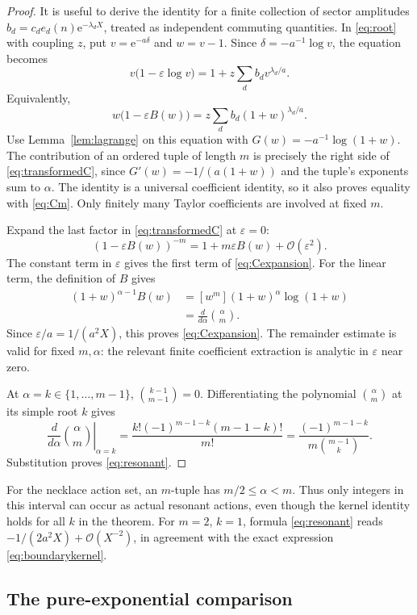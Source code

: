 \documentclass[11pt,a4paper]{article}
\numberwithin{equation}{section}
\theoremstyle{definition}
\theoremstyle{remark}
\newcommand{\ee}{\mathrm e}
\newcommand{\bigO}{\mathcal O}
\newcommand{\eps}{\varepsilon}
\begin{document}
\begin{proof}
It is useful to derive the identity for a finite collection of sector
amplitudes $b_d=c_de_d(n)\ee^{-\lambda_dX}$, treated as independent
commuting quantities. In \eqref{eq:root} with coupling $z$, put
$v=\ee^{-a\delta}$ and $w=v-1$. Since
$\delta=-a^{-1}\log v$, the equation becomes
\[
 v\bigl(1-\eps\log v\bigr)
 =1+z\sum_d b_d v^{\lambda_d/a}.
\]
Equivalently,
\begin{equation}
 w\bigl(1-\eps B(w)\bigr)
 =z\sum_d b_d(1+w)^{\lambda_d/a}.
 \label{eq:wequation}
\end{equation}
Use Lemma~\ref{lem:lagrange} on this equation with
$G(w)=-a^{-1}\log(1+w)$. The contribution of an ordered tuple of
length $m$ is precisely the right side of
\eqref{eq:transformedC}, since $G'(w)=-1/(a(1+w))$ and the tuple's
exponents sum to $\alpha$. The identity is a universal coefficient
identity, so it also proves equality with \eqref{eq:Cm}. Only finitely
many Taylor coefficients are involved at fixed $m$.

Expand the last factor in \eqref{eq:transformedC} at $\eps=0$:
\[
 (1-\eps B(w))^{-m}=1+m\eps B(w)+\bigO(\eps^2).
\]
The constant term in $\eps$ gives the first term of
\eqref{eq:Cexpansion}. For the linear term, the definition of $B$
gives
\begin{align*}
 [w^{m-1}](1+w)^{\alpha-1}B(w)
 &=[w^m](1+w)^\alpha\log(1+w)\\
 &=\frac{d}{d\alpha}\binom{\alpha}{m}.
\end{align*}
Since $\eps/a=1/(a^2X)$, this proves \eqref{eq:Cexpansion}.
The remainder estimate is valid for fixed $m,\alpha$: the relevant
finite coefficient extraction is analytic in $\eps$ near zero.

At $\alpha=k\in\{1,\ldots,m-1\}$,
$\binom{k-1}{m-1}=0$. Differentiating the polynomial
$\binom{\alpha}{m}$ at its simple root $k$ gives
\[
 \left.\frac{d}{d\alpha}\binom{\alpha}{m}\right|_{\alpha=k}
 =\frac{k!(-1)^{m-1-k}(m-1-k)!}{m!}
 =\frac{(-1)^{m-1-k}}{m\binom{m-1}{k}}.
\]
Substitution proves \eqref{eq:resonant}.
\end{proof}

For the necklace action set, an $m$-tuple has
$m/2\le\alpha<m$. Thus only integers in this interval can occur as
actual resonant actions, even though the kernel identity holds for all
$k$ in the theorem. For $m=2$, $k=1$, formula \eqref{eq:resonant}
reads $-1/(2a^2X)+\bigO(X^{-2})$, in agreement with the exact
expression \eqref{eq:boundarykernel}.

\subsection{The pure-exponential comparison}
\end{document}
